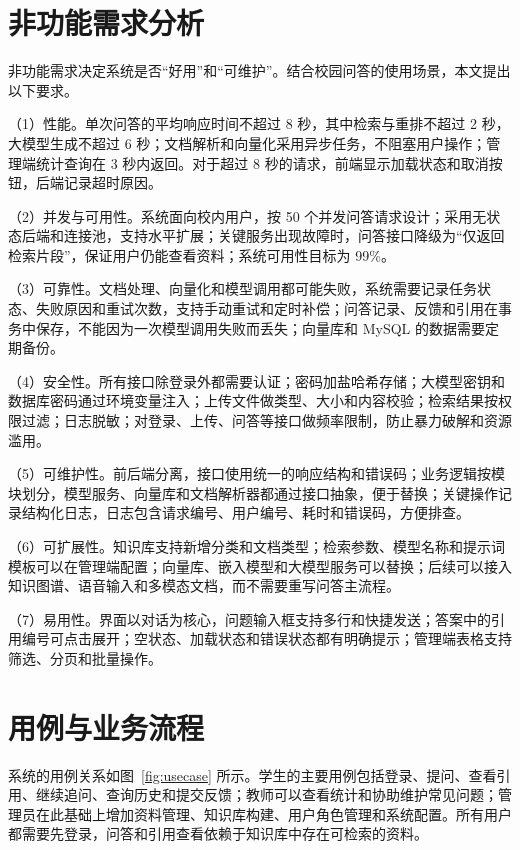 \section{非功能需求分析}
\label{sec:nonfunctional}

非功能需求决定系统是否“好用”和“可维护”。结合校园问答的使用场景，本文提出以下要求。

（1）性能。单次问答的平均响应时间不超过 8 秒，其中检索与重排不超过 2 秒，大模型生成不超过 6 秒；文档解析和向量化采用异步任务，不阻塞用户操作；管理端统计查询在 3 秒内返回。对于超过 8 秒的请求，前端显示加载状态和取消按钮，后端记录超时原因。

（2）并发与可用性。系统面向校内用户，按 50 个并发问答请求设计；采用无状态后端和连接池，支持水平扩展；关键服务出现故障时，问答接口降级为“仅返回检索片段”，保证用户仍能查看资料；系统可用性目标为 99\%。

（3）可靠性。文档处理、向量化和模型调用都可能失败，系统需要记录任务状态、失败原因和重试次数，支持手动重试和定时补偿；问答记录、反馈和引用在事务中保存，不能因为一次模型调用失败而丢失；向量库和 MySQL 的数据需要定期备份。

（4）安全性。所有接口除登录外都需要认证；密码加盐哈希存储；大模型密钥和数据库密码通过环境变量注入；上传文件做类型、大小和内容校验；检索结果按权限过滤；日志脱敏；对登录、上传、问答等接口做频率限制，防止暴力破解和资源滥用。

（5）可维护性。前后端分离，接口使用统一的响应结构和错误码；业务逻辑按模块划分，模型服务、向量库和文档解析器都通过接口抽象，便于替换；关键操作记录结构化日志，日志包含请求编号、用户编号、耗时和错误码，方便排查。

（6）可扩展性。知识库支持新增分类和文档类型；检索参数、模型名称和提示词模板可以在管理端配置；向量库、嵌入模型和大模型服务可以替换；后续可以接入知识图谱、语音输入和多模态文档，而不需要重写问答主流程。

（7）易用性。界面以对话为核心，问题输入框支持多行和快捷发送；答案中的引用编号可点击展开；空状态、加载状态和错误状态都有明确提示；管理端表格支持筛选、分页和批量操作。

\section{用例与业务流程}
\label{sec:usecase}

系统的用例关系如图~\ref{fig:usecase} 所示。学生的主要用例包括登录、提问、查看引用、继续追问、查询历史和提交反馈；教师可以查看统计和协助维护常见问题；管理员在此基础上增加资料管理、知识库构建、用户角色管理和系统配置。所有用户都需要先登录，问答和引用查看依赖于知识库中存在可检索的资料。

